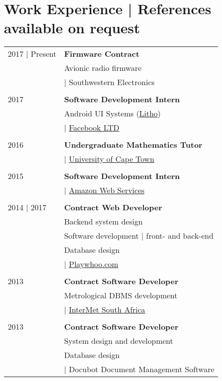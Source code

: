 \section{Work Experience \footnotesize | References available on request}

\begin{tabular}{R{2.5cm}|l}

2017 | Present & \textbf{Firmware Contract}\\
               & Avionic radio firmware\\
               & | Southwestern Electronics\\
               & \\

2017           & \textbf{Software Development Intern}\\
               & Android UI Systems (\href{https://fblitho.com/index.html}{Litho})\\
               & | \href{http://fb.com}{Facebook LTD}\\
               & \\

2016           & \textbf{Undergraduate Mathematics Tutor}\\
               & | \href{http://uct.ac.za}{University of Cape Town}\\
               & \\

2015           & \textbf{Software Development Intern }\\
               & | \href{https://aws.amazon.com}{Amazon Web Services}\\
               & \\

2014 | 2017    & \textbf{Contract Web Developer}\\
               & Backend system design\\
               & Software development | front- and  back-end\\
               & Database design\\
               & | \href{https://playwhoo.com}{Playwhoo.com}\\
               & \\

2013           & \textbf{Contract Software Developer}\\
               & Metrological DBMS development\\
               & | \href{http://www.diel.co.za}{InterMet South Africa}\\
               & \\

2013           & \textbf{Contract Software Developer}\\
               & System design and development\\
               & Database design\\
               & | Docubot Document Management Software
\end{tabular}


